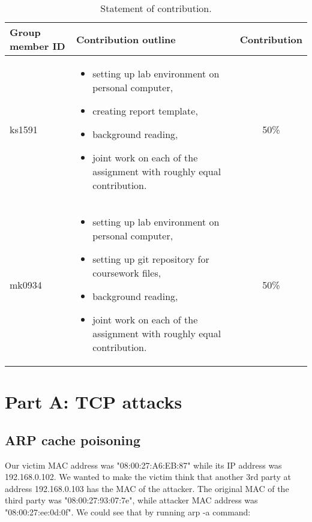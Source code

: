 \documentclass[12pt, a4paper, pdflatex]{article}
\begin{document}
\begin{center}
  \begin{table}[h]
    \begin{tabular}{ l | p{8.5cm} | c }
      Group member ID & Contribution outline & Contribution \\
      \hline
      ks1591 &
      \begin{itemize}
        \item setting up lab environment on personal computer,
        \item creating report template,
        \item background reading,
        \item joint work on each of the assignment with roughly equal contribution.
      \end{itemize}
      & 50\% \\
      mk0934 &
      \begin{itemize}
        \item setting up lab environment on personal computer,
        \item setting up git repository for coursework files,
        \item background reading,
        \item joint work on each of the assignment with roughly equal contribution.
      \end{itemize}
      & 50\% \\
    \end{tabular}
    \caption{Statement of contribution.\label{tab:SoC}}
  \end{table}
\end{center}

\section{Part A: TCP attacks}

\subsection{ARP cache poisoning}

Our victim MAC address was "08:00:27:A6:EB:87" while its IP address was 192.168.0.102. We wanted to make the victim think that another 3rd party at address 192.168.0.103 has the MAC of the attacker. The original MAC of the third party was "08:00:27:93:07:7e", while attacker MAC address was "08:00:27:ee:0d:0f". We could see that by running arp -a command:
\end{document}
